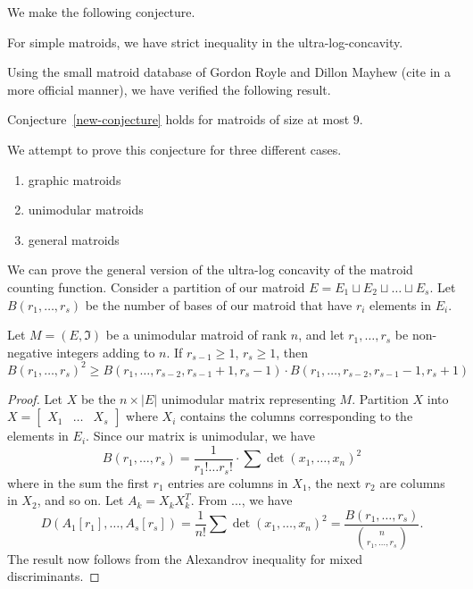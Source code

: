 \documentclass[12pt]{article}
\begin{document}
We make the following conjecture. 

\begin{conj} \label{new-conjecture}
	For simple matroids, we have strict inequality in the ultra-log-concavity. 
\end{conj}

Using the small matroid database of Gordon Royle and Dillon Mayhew (cite in a more official manner), we have verified the following result. 

\begin{thm}
	Conjecture~\ref{new-conjecture} holds for matroids of size at most $9$. 
\end{thm}

We attempt to prove this conjecture for three different cases. 
\begin{enumerate}[label = (\roman*)]
	\item graphic matroids
	\item unimodular matroids
	\item general matroids 
\end{enumerate}

We can prove the general version of the ultra-log concavity of the matroid counting function. Consider a partition of our matroid $E = E_1 \sqcup E_2 \sqcup \ldots \sqcup E_s$. Let $B(r_1, \ldots, r_s)$ be the number of bases of our matroid that have $r_i$ elements in $E_i$. 

\begin{thm}
	Let $M = (E, \mathfrak{I})$ be a unimodular matroid of rank $n$, and let $r_1, \ldots, r_s$ be non-negative integers adding to $n$. If $r_{s-1} \geq 1$, $r_s \geq 1$, then 
	\[
		B(r_1, \ldots, r_s)^2 \geq B(r_1, \ldots, r_{s-2}, r_{s-1} + 1, r_s - 1) \cdot B(r_1, \ldots, r_{s-2}, r_{s-1} - 1, r_{s} + 1)
	\]
\end{thm}

\begin{proof}
	Let $X$ be the $n \times |E|$ unimodular matrix representing $M$. Partition $X$ into $X = \begin{bmatrix} X_1 & \ldots & X_s \end{bmatrix}$ where $X_i$ contains the columns corresponding to the elements in $E_i$. Since our matrix is unimodular, we have 
	\[
		B(r_1, \ldots, r_s) = \frac{1}{r_1! \ldots r_s!} \cdot \sum \det (x_1, \ldots, x_n)^2
	\]
	where in the sum the first $r_1$ entries are columns in $X_1$, the next $r_2$ are columns in $X_2$, and so on. Let $A_k = X_k X_k^T$. From ..., we have 
	\[
		D(A_1 [r_1], \ldots, A_s [r_s]) = \frac{1}{n!} \sum \det (x_1, \ldots, x_n)^2 = \frac{B(r_1, \ldots, r_s)}{\binom{n}{r_1, \ldots, r_s}}. 
	\] 
	The result now follows from the Alexandrov inequality for mixed discriminants. 
\end{proof}
\end{document}
